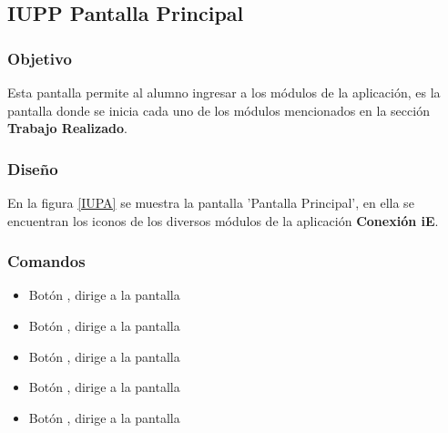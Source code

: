 \subsection{IUPP Pantalla Principal}

\subsubsection{Objetivo}

	
 	Esta pantalla permite al alumno ingresar a los módulos de la aplicación, es la pantalla donde se inicia cada uno de los módulos mencionados en la sección \textbf{Trabajo Realizado}.
\subsubsection{Diseño}


    En la figura \ref{IUPA} se muestra la pantalla 'Pantalla Principal', en ella se encuentran los iconos de los diversos módulos de la aplicación \textbf{Conexión iE}.



\subsubsection{Comandos}
\begin{itemize}
	
	\item Botón \botSalones, dirige a la pantalla 
	\item Botón \botProfesores, dirige a la pantalla 
	\item Botón \botUnidades, dirige a la pantalla 
	\item Botón \botCursos, dirige a la pantalla 
	\item Botón \botMovilidad, dirige a la pantalla 
\end{itemize}

